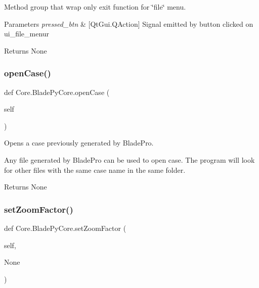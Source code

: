 Method group that wrap only exit function for \char`\"{}file\char`\"{} menu. 


\begin{DoxyParams}{Parameters}
{\em pressed\+\_\+btn} & \mbox{[}Qt\+Gui.\+Q\+Action\mbox{]} Signal emitted by button clicked on ui\+\_\+file\+\_\+menur \\
\hline
\end{DoxyParams}
\begin{DoxyReturn}{Returns}
None 
\end{DoxyReturn}
\hypertarget{a00079_ac45b825bd62e01689fb2987a0a2d850a}{}\label{a00079_ac45b825bd62e01689fb2987a0a2d850a} 
\subsubsection{\texorpdfstring{open\+Case()}{openCase()}}
{\footnotesize\ttfamily def Core.\+Blade\+Py\+Core.\+open\+Case (\begin{DoxyParamCaption}\item[{}]{self }\end{DoxyParamCaption})}



Opens a case previously generated by Blade\+Pro. 

Any file generated by Blade\+Pro can be used to open case. The program will look for other files with the same case name in the same folder.

\begin{DoxyReturn}{Returns}
None 
\end{DoxyReturn}
\hypertarget{a00079_a2c818d907d8c5797873e1a7ad54c7d13}{}\label{a00079_a2c818d907d8c5797873e1a7ad54c7d13} 
\subsubsection{\texorpdfstring{set\+Zoom\+Factor()}{setZoomFactor()}}
{\footnotesize\ttfamily def Core.\+Blade\+Py\+Core.\+set\+Zoom\+Factor (\begin{DoxyParamCaption}\item[{}]{self,  }\item[{}]{None }\end{DoxyParamCaption})}



